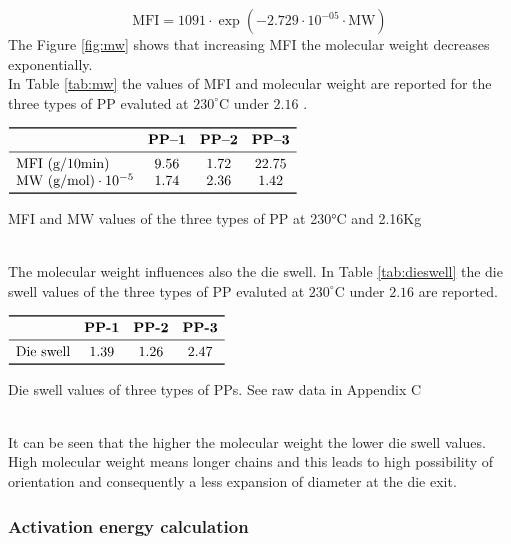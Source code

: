 \documentclass[a4paper, 11pt]{article}
\begin{document}
\begin{equation}
\text{MFI} = 1091\cdot \exp({-2.729\cdot 10^{-05}\cdot\text{MW}})
\label{eq:mw}
\end{equation}
The Figure \ref{fig:mw} shows that increasing MFI the molecular weight decreases exponentially.\\ In Table \ref{tab:mw} the values of MFI and molecular weight are reported for the three types of PP evaluted at $230 ^\circ$C under $2.16$ .
\begin{table}[htp]
\centering
$
\begin{array}{lccc}
\toprule
\text{} & \textbf{PP–1} & \textbf{PP–2} & \textbf{PP–3} \\
\midrule
\text{MFI (g/10min)} & 9.56 & 1.72 & 22.75  \\
\text{MW (g/mol)}\cdot 10^{-5} & 1.74 & 2.36 & 1.42 \\
\bottomrule
\end{array}
$
\caption{MFI and MW values of the three types of PP at 230°C and 2.16Kg}
\label{tab:mw}
\end{table}\\
The molecular weight influences also the die swell. In Table \ref{tab:dieswell} the die swell values of the three types of PP evaluted at $230 ^\circ$C under $2.16$  are reported.
\begin{table}[htp]
\centering
$
\begin{array}{cccc}
\toprule
\text{} & \textbf{PP-1} & \textbf{PP-2} & \textbf{PP-3} \\
\midrule
\text{Die swell} & 1.39 & 1.26 & 2.47  \\
\bottomrule
\end{array}
$
\caption{Die swell values of three types of PPs. See raw data in Appendix C}
\label{tab:dieswell}
\end{table}\\
It can be seen that the higher the molecular weight the lower die swell values. High molecular weight means longer chains and this leads to high possibility of orientation and consequently a less expansion of diameter at the die exit.

\newpage

\subsubsection{Activation energy calculation}
\end{document}
